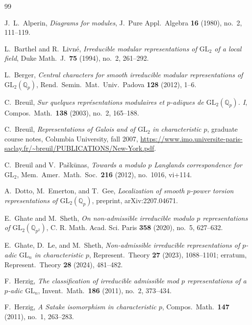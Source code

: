 \documentclass[a4paper,10pt,twoside]{amsart}
\theoremstyle{definition}
\numberwithin{equation}{section}
\begin{document}
\begin{thebibliography}{99}

J.~L.~Alperin,
\textit{Diagrams for modules},
J.\ Pure Appl.\ Algebra \textbf{16} (1980), no.~2, 111--119.

L.~Barthel and R.~Livn\'e,
\textit{Irreducible modular representations of \(\mathrm{GL}_2\) of a local field},
Duke Math.\ J.\ \textbf{75} (1994), no.~2, 261--292.

L.~Berger,
\textit{Central characters for smooth irreducible modular representations of
\(\mathrm{GL}_2(\mathbb Q_p)\)},
Rend.\ Semin.\ Mat.\ Univ.\ Padova \textbf{128} (2012), 1--6.

C.~Breuil,
\textit{Sur quelques repr\'esentations modulaires et \(p\)-adiques de
\(\mathrm{GL}_2(\mathbb Q_p)\). I},
Compos.\ Math.\ \textbf{138} (2003), no.~2, 165--188.

C.~Breuil,
\textit{Representations of Galois and of \(\mathrm{GL}_2\) in characteristic \(p\)},
graduate course notes, Columbia University, fall 2007,
\url{https://www.imo.universite-paris-saclay.fr/~breuil/PUBLICATIONS/New-York.pdf}.

C.~Breuil and V.~Pa\v{s}k\={u}nas,
\textit{Towards a modulo \(p\) Langlands correspondence for \(\mathrm{GL}_2\)},
Mem.\ Amer.\ Math.\ Soc.\ \textbf{216} (2012), no.~1016, vi+114.

A.~Dotto, M.~Emerton, and T.~Gee,
\textit{Localization of smooth \(p\)-power torsion representations
of \(\mathrm{GL}_2(\mathbb Q_p)\)},
preprint, arXiv:2207.04671.

E.~Ghate and M.~Sheth,
\emph{On non-admissible irreducible modulo \(p\) representations of
\(\mathrm{GL}_{2}(\mathbb{Q}_{p^{2}})\)},
C. R. Math. Acad. Sci. Paris \textbf{358} (2020), no.~5, 627--632.

E.~Ghate, D.~Le, and M.~Sheth,
\textit{Non-admissible irreducible representations of \(p\)-adic
\(\mathrm{GL}_n\) in characteristic \(p\)},
Represent.\ Theory \textbf{27} (2023), 1088--1101;
erratum, Represent.\ Theory \textbf{28} (2024), 481--482.

F.~Herzig,
\textit{The classification of irreducible admissible mod \(p\)
representations of a \(p\)-adic \(\mathrm{GL}_n\)},
Invent.\ Math.\ \textbf{186} (2011), no.~2, 373--434.

F.~Herzig,
\textit{A Satake isomorphism in characteristic \(p\)},
Compos.\ Math.\ \textbf{147} (2011), no.~1, 263--283.


\end{thebibliography}
\end{document}
